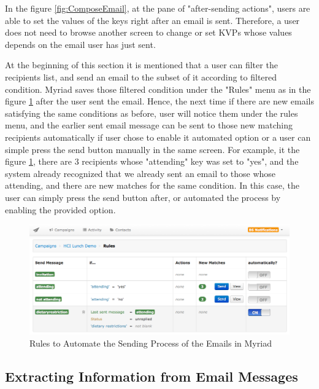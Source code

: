 In the figure \ref{fig:ComposeEmail}, at the pane of "after-sending actions", users are able to set the values of the keys right after an email is sent. Therefore, a user does not need to browse another screen to change or set \ac{KVP}s whose values depends on the email user has just sent.
\vspace{1cm}

At the beginning of this section it is mentioned that a user can filter the recipients list, and send an email to the subset of it according to filtered condition. Myriad saves those filtered condition under the "Rules" menu as in the figure \ref{fig:AutomatedRules} after the user sent the email. Hence, the next time if there are new emails satisfying the same conditions as before, user will notice them under the rules menu, and the earlier sent email message can be sent to those new matching recipients automatically if user chose to enable it automated option or a user can simple press the send button manually in the same screen. For example, it the figure \ref{fig:AutomatedRules}, there are 3 recipients whose "attending" key was set to "yes", and the system already recognized that we already sent an email to those whose attending, and there are new matches for the same condition. In this case, the user can simply press the send button after, or automated the process by enabling the provided option.

\clearpage

\begin{figure}[htbp]
	\centering
	\includegraphics[width=1.00\textwidth]{imgs/AutomatedRules.png}
	\caption[Rules to Automate the Sending Process of the Emails in Myriad]{Rules to Automate the Sending Process of the Emails in Myriad}
	\label{fig:AutomatedRules}
\end{figure}

\subsection{Extracting Information from Email Messages}
\label{subsec:5.2.5:ExtrInfoEmaiMess}

